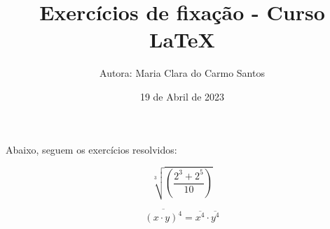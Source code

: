 \documentclass[a4paper, 12pt]{article}
\title{Exercícios de fixação - Curso LaTeX}
\author{Autora: Maria Clara do Carmo Santos}
\date{19 de Abril de 2023}
\begin{document}
\maketitle

Abaixo, seguem os exercícios resolvidos:

\begin{equation}
\sqrt[3]{\left(\frac{2^3+2^5}{10}\right)}
\end{equation}

\begin{equation}
\overline{(x\cdot y)^4} = \overline{x^4}\cdot \overline{y^4}
\end{equation}
\end{document}
